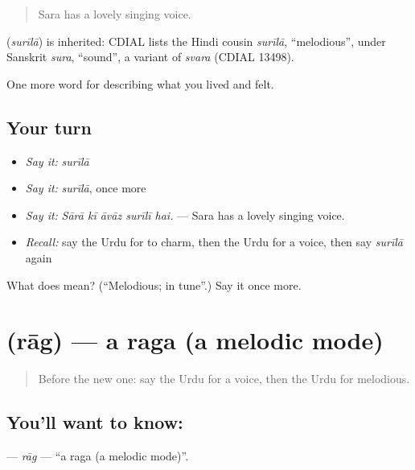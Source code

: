 \begin{quote}
Sara has a lovely singing voice.
\end{quote}

\begin{cousinweb}
\textbf{} (\emph{surīlā}) is inherited: CDIAL lists the Hindi cousin \emph{surīlā}, \textquotedblleft{}melodious\textquotedblright{}, under Sanskrit \emph{sura}, \textquotedblleft{}sound\textquotedblright{}, a variant of \emph{svara} (CDIAL 13498).
\end{cousinweb}

\begin{grammarlens}[title={What you've built}]
One more word for describing what you lived and felt.
\end{grammarlens}

\subsection*{Your turn}
\begin{itemize}
\raggedright
  \item \emph{Say it:} \emph{surīlā}
  \item \emph{Say it:} \emph{surīlā}, once more
  \item \emph{Say it:} \emph{Sārā kī āvāz surīlī hai.} — Sara has a lovely singing voice.
  \item \emph{Recall:} say the Urdu for to charm, then the Urdu for a voice, then say \emph{surīlā} again
\end{itemize}

\begin{tcolorbox}[breakable,colback=teal!4,colframe=teal!35!black,title={Before you move on}]
What does  mean? (\textquotedblleft{}Melodious; in tune\textquotedblright{}.) Say it once more.
\end{tcolorbox}
\section[\texorpdfstring{\ur{راگ} (rāg)}{راگ (rāg)}]{ (rāg) — a raga (a melodic mode)}

\label{lesson:UR-C518-rag}



\begin{quote}
Before the new one: say the Urdu for a voice, then the Urdu for melodious.
\end{quote}

\subsection*{You'll want to know: }
\textbf{} — \emph{rāg} — \textquotedblleft{}a raga (a melodic mode)\textquotedblright{}.

